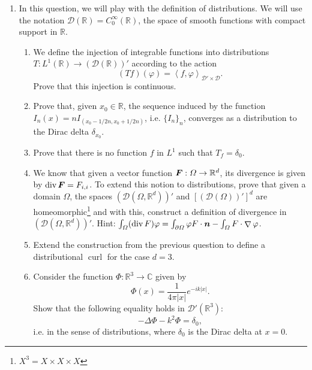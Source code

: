 \documentclass{article}
\renewcommand{\vec}{\vectorsym}
\DeclareMathOperator{\grad}{\nabla}
\DeclareMathOperator{\dive}{\text{div}}
\DeclareMathOperator{\curl}{\text{curl}}
\newcommand{\R}{\mathbb{R}}
\begin{document}
\begin{enumerate}
    \item In this question, we will play with the definition of distributions. We will use the notation $\mathcal D(\R) = C_0^\infty(\R)$, the space of smooth functions with compact support in $\R$.
        \begin{enumerate}
            \item{} We define the injection of integrable functions into distributions $T:L^1(\R) \to \left(\mathcal D(\R)\right)'$ according to the action
                $$ (Tf)(\varphi)  = \left\langle f, \varphi\right\rangle_{\mathcal D'\times \mathcal D}.$$
                Prove that this injection is continuous. 
            \item{} Prove that, given $x_0\in \R$, the sequence induced by the function $I_n(x) = nI_{(x_0-1/2n, x_0+1/2n)}$, i.e. $\{I_n\}_n$, converges as a distribution to the Dirac delta $\delta_{x_0}$. 
            \item{} Prove that there is no function $f$ in $L^1$ such that $T_f = \delta_0$. 
            \item{} We know that given a vector function $\vec F:\Omega \to \R^d$, its divergence is given by $\dive{\vec F}=F_{i,i}$. To extend this notion to distributions, prove that given a domain $\Omega$, the spaces $(\mathcal D(\Omega, \R^d))'$ and $[(\mathcal D(\Omega))']^d$ are homeomorphic\footnote{$X^3 = X\times X\times X$} and with this, construct a definition of divergence in $(\mathcal D(\Omega, \R^d))'$. Hint: $\int_\Omega (\dive F)\varphi = \int_{\partial\Omega} \varphi F\cdot \vec n - \int_\Omega F\cdot \grad \varphi$. 
            \item{} Extend the construction from the previous question to define a distributional $\curl$ for the case $d=3$. 
            \item{} Consider the function $\Phi:\R^3\to \mathbb C$ given by
                    $$ \Phi(x) = \frac{1}{4\pi|x|} e^{-ik |x|}. $$
                Show that the following equality holds in $\mathcal D'(\R^3)$:
                        $$ -\Delta \Phi - k^2 \Phi = \delta_0, $$
                i.e. in the sense of distributions, where $\delta_0$ is the Dirac delta at $x=0$. 
        \end{enumerate}
\end{enumerate}

\end{document}
